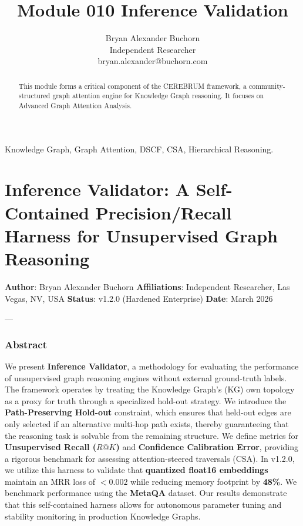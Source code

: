 \documentclass[10pt,journal,compsoc]{IEEEtran}
\begin{document}
\title{Module 010 Inference Validation}
\author{Bryan Alexander Buchorn \\ Independent Researcher \\ bryan.alexander@buchorn.com}

\maketitle

\begin{abstract}
This module forms a critical component of the CEREBRUM framework, a community-structured graph attention engine for Knowledge Graph reasoning. It focuses on Advanced Graph Attention Analysis.
\end{abstract}

\begin{IEEEkeywords}
Knowledge Graph, Graph Attention, DSCF, CSA, Hierarchical Reasoning.
\end{IEEEkeywords}

\section{Inference Validator: A Self-Contained Precision/Recall Harness for Unsupe\-rvised Graph Reasoning}

\textbf{Author}: Bryan Alexander Buchorn  
\textbf{Affili\-ations}: Independent Researcher, Las Vegas, NV, USA  
\textbf{Status}: v1.2.0 (Hardened Enterprise)  
\textbf{Date}: March 2026

---

\subsubsection{Abstract}
We present \textbf{Inference Validator}, a methodology for evaluating the performance of unsup\-ervised graph reasoning engines without external ground-truth labels. The framework operates by treating the Knowledge Graph's (KG) own topology as a proxy for truth through a specialized hold-out strategy. We introduce the \textbf{Path-Preserving Hold-out} constraint, which ensures that held-out edges are only selected if an alternative multi-hop path exists, thereby guara\-nteeing that the reasoning task is solvable from the remaining structure. We define metrics for \textbf{Unsupe\-rvised Recall ($R@K$)} and \textbf{Confidence Calibration Error}, providing a rigorous benchmark for assessing attention-steered traversals (CSA). In v1.2.0, we utilize this harness to validate that \textbf{quantized float16 embeddings} maintain an MRR loss of $< 0.002$ while reducing memory footprint by \textbf{48\%}. We benchmark performance using the \textbf{MetaQA} \cite{metaqa2017} dataset. Our results demonstrate that this self-contained harness allows for autonomous parameter tuning and stability monitoring in production Knowledge Graphs.
\end{document}
